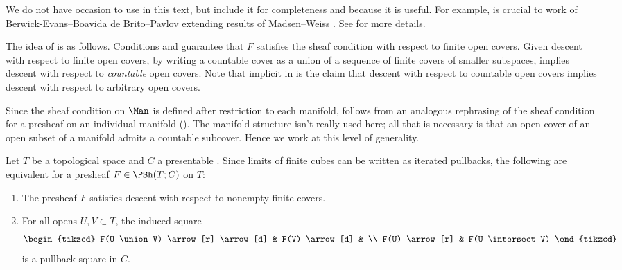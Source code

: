 We do not have occasion to use  in this text, but include it for completeness and because it is useful.
For example,  is crucial to work of Berwick-Evans--Boavida de Brito--Pavlov \cite{BEBdBP:Classifying} extending results of Madsen--Weiss \cite[Appendix A]{MR2335797}.
See  for more details.

The idea of  is as follows.
Conditions  and  guarantee that $ F $ satisfies the sheaf condition with respect to finite open covers.
Given descent with respect to finite open covers, by writing a countable cover as a union of a sequence of finite covers of smaller subspaces,  implies descent with respect to \textit{countable} open covers.
Note that implicit in  is the claim that descent with respect to countable open covers implies descent with respect to arbitrary open covers.

Since the sheaf condition on $ \Man $ is defined after restriction to each manifold,  follows from an analogous rephrasing of the sheaf condition for a presheaf on an individual manifold ().
The manifold structure isn't really used here; all that is necessary is that an open cover of an open subset of a manifold admits a countable subcover.
Hence we work at this level of generality.

\begin{observation}\label{obs:descfinitecovers}
	Let $ T $ be a topological space and $ C $ a presentable \category.
	Since limits of finite cubes can be written as iterated pullbacks, the following are equivalent for a presheaf $ F \in \PSh(T;C) $ on $ T $:
	\begin{enumerate}
		\item The presheaf $ F $ satisfies descent with respect to nonempty finite covers.

		\item For all opens $ U, V \subset T $, the induced square 
		\begin{equation*}
			\begin{tikzcd}
				F(U \union V) \arrow[r] \arrow[d] & F(V) \arrow[d] & \\
				F(U) \arrow[r] & F(U \intersect V) 
			\end{tikzcd}
		\end{equation*}
		is a pullback square in $ C $.
	\end{enumerate}
\end{observation}


